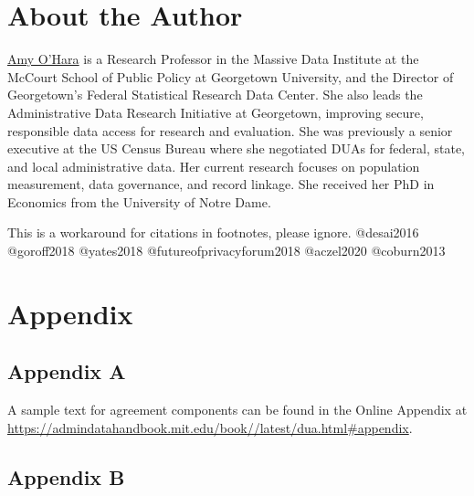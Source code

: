\hypertarget{about-the-author}{%
\section*{About the Author}\label{about-the-author}}

\href{https://gufaculty360.georgetown.edu/s/contact/0033600001nHXCZAA4/amy-ohara}{Amy O'Hara} is a Research Professor in the Massive Data Institute at the McCourt School of Public Policy at Georgetown University, and the Director of Georgetown's Federal Statistical Research Data Center. She also leads the Administrative Data Research Initiative at Georgetown, improving secure, responsible data access for research and evaluation. She was previously a senior executive at the US Census Bureau where she negotiated DUAs for federal, state, and local administrative data. Her current research focuses on population measurement, data governance, and record linkage. She received her PhD in Economics from the University of Notre Dame.

\begin{invisible}
This is a workaround for citations in footnotes, please ignore.
@desai2016 @goroff2018 @yates2018 @futureofprivacyforum2018 @aczel2020
@coburn2013
\end{invisible}

\putbib

\FloatBarrier\newpage

\hypertarget{appendix}{%
\section*{Appendix}\label{appendix}}

\hypertarget{appendix-a}{%
\subsection*{Appendix A}\label{appendix-a}}

A sample text for agreement components can be found in the Online Appendix at \url{https://admindatahandbook.mit.edu/book//latest/dua.html#appendix}.

\hypertarget{appendix-b}{%
\subsection*{Appendix B}\label{appendix-b}}

